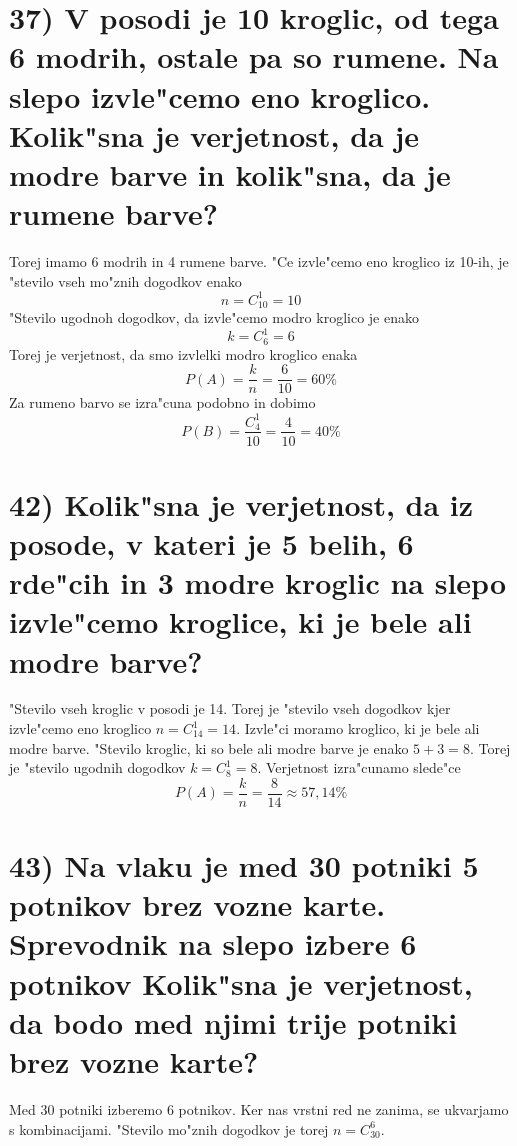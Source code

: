 \documentclass[a4paper, 12pt]{article}
\begin{document}
\section*{37) V posodi je 10 kroglic, od tega 6 modrih, ostale pa so rumene. Na slepo izvle"cemo eno kroglico. Kolik"sna je verjetnost, da je modre barve in kolik"sna, da je rumene barve?}
Torej imamo 6 modrih in 4 rumene barve. "Ce izvle"cemo eno kroglico iz 10-ih, je "stevilo vseh mo"znih dogodkov enako
\begin{equation*}
n = C_{10}^1 = 10
\end{equation*}
"Stevilo ugodnoh dogodkov, da izvle"cemo modro kroglico je enako
\begin{equation*}
k = C_{6}^1 = 6
\end{equation*}
Torej je verjetnost, da smo izvlelki modro kroglico enaka
\begin{equation*}
P(A) = \dfrac{k}{n} = \dfrac{6}{10} = 60\%
\end{equation*}
Za rumeno barvo se izra"cuna podobno in dobimo
\begin{equation*}
P(B) = \dfrac{C_4^1}{10} = \dfrac{4}{10} = 40\%
\end{equation*}

\section*{42) Kolik"sna je verjetnost, da iz posode, v kateri je 5 belih, 6 rde"cih in 3 modre kroglic na slepo izvle"cemo kroglice, ki je bele ali modre barve?}
"Stevilo vseh kroglic v posodi je 14. Torej je "stevilo vseh dogodkov kjer izvle"cemo eno kroglico $n = C_{14}^1 = 14$. Izvle"ci moramo kroglico, ki je bele ali modre barve. "Stevilo kroglic, ki so bele ali modre barve je enako $5 + 3 = 8$. Torej je "stevilo ugodnih dogodkov $k = C_8^1 = 8$. Verjetnost izra"cunamo slede"ce
\begin{equation*}
P(A) = \dfrac{k}{n} = \dfrac{8}{14} \approx 57,14\%
\end{equation*}

\section*{43) Na vlaku je med 30 potniki 5 potnikov brez vozne karte. Sprevodnik na slepo izbere 6 potnikov Kolik"sna je verjetnost, da bodo med njimi trije potniki brez vozne karte?}
Med 30 potniki izberemo 6 potnikov. Ker nas vrstni red ne zanima, se ukvarjamo s kombinacijami. "Stevilo mo"znih dogodkov je torej $n = C_{30}^6$. 
\end{document}
